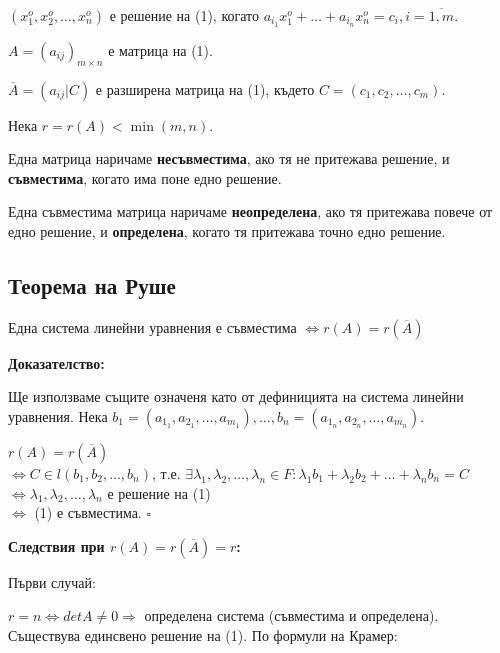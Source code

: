 \documentclass[fleqn,12pt]{article}
\begin{document}
\begin{flushleft}
$(x_1^o, x_2^o, \dots, x_n^o)$ е решение на (1), когато $a_{i_1}x_1^o+\dots+a_{i_n}x_n^o = c_i, i = \overline{1,m}$.

$ A = (a_{ij})_{m \times n} $ е матрица на (1).

$ \overline{A} = (a_{ij} | C) $ е разширена матрица на (1), където $C = (c_1, c_2, \dots, c_m)$.

Нека $ r = r(A) < \min(m, n) $. \\

\vspace{5mm}

Една матрица наричаме \textbf{несъвместима}, ако тя не притежава решение, и \textbf{съвместима}, когато има поне едно решение.

\vspace{5mm}

Една съвместима матрица наричаме \textbf{неопределена}, ако тя притежава повече от едно решение, и \textbf{определена}, когато тя притежава точно едно решение.


\subsection{Теорема на Руше}
Една система линейни уравнения е съвместима $ \Leftrightarrow r(A) = r(\overline{A}) $

\vspace{5mm}
    
    \textbf{Доказателство:}

    Ще използваме същите означеня като от дефиницията на система линейни уравнения.
    Нека $b_1 = (a_{1_1}, a_{2_1}, \dots, a_{m_1}), \dots, b_n = (a_{1_n}, a_{2_n}, \dots, a_{m_n})$.

    \vspace{5mm}

    $ r(A) = r(\overline{A})$ \\
    $\Leftrightarrow C \in l(b_1, b_2, \dots, b_n)$, т.е. $\exists \lambda_1, \lambda_2, \dots, \lambda_n \in F: \lambda_1 b_1 + \lambda_2 b_2 + \dots + \lambda_n b_n = C$ \\
    $\Leftrightarrow \lambda_1, \lambda_2, \dots, \lambda_n$ е решение на (1) \\
    $\Leftrightarrow$ (1) е съвместима. $\square$

    \vspace{5mm}
    \textbf{Следствия при $r(A) = r(\overline{A}) = r$:}


    Първи случай: 

    $ r = n \Leftrightarrow detA \neq 0 \Rightarrow $ определена система (съвместима и определена). Съществува единсвено решение на (1). По формули на Крамер:


\end{flushleft}
\end{document}
